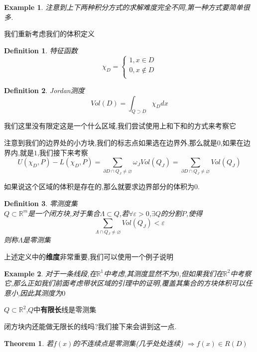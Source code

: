\documentclass[11pt,hyperref,a4paper,UTF8]{ctexart}
\newtheorem{theorem}{Theorem}[subsection]
\newtheorem{example}{Example}[subsection]
\newtheorem{definition}{Definition}[subsection]
\newcommand{\RR}{\mathbb{R}}
\begin{document}
\begin{CJK}{UTF8}{gkai}
\begin{example}
  注意到上下两种积分方式的求解难度完全不同,第一种方式要简单很多.
\end{example}

我们重新考虑我们的体积定义
\begin{definition}
  特征函数\\

  \[\chi_D = \begin{cases}
    1 , x\in D\\
    0 , x \notin D\\
  \end{cases}\]
\end{definition}

\begin{definition}
  Jordan测度\\

  \[Vol(D) = \int_{Q \supset D} \chi_D dx\]
\end{definition}

我们这里没有限定这是一个什么区域,我们尝试使用上和下和的方式来考察它

注意到我们的边界处的小方块,我们的标志点如果选在边界外,那么就是$0$,如果在边界内,就是$1$,我们接下来考察
\[U(\chi_D,P) - L(\chi_D,P) = \sum_{\partial D \cap Q_J \neq \varnothing} \omega_J Vol(Q_J) = \sum_{\partial D \cap Q_J \neq \varnothing} Vol(Q_J)\]

如果说这个区域的体积是存在的,那么就要求边界部分的体积为$0$.

\begin{definition}
  零测度集\\

  $Q \subset \RR^m$是一个闭方块,对于集合$\Lambda \subset Q$,若$\forall \varepsilon > 0$,$\exists Q$的分割$P$,使得
  \[\sum_{\Lambda \cap Q_J \neq \varnothing} Vol(Q_J) < \varepsilon\]
  则称$\Lambda$是零测集
\end{definition}

上述定义中的\textbf{维度}非常重要,我们可以使用一个例子说明

\begin{example}
  对于一条线段,在$\RR^1$中考虑,其测度显然不为$0$,但如果我们在$\RR^2$中考察它,那么正如我们前面考虑带状区域的引理中的证明,覆盖其集合的方块体积可以任意小,因此其测度为$0$
\end{example}

$Q \subset \RR^2$,$Q$中\textbf{有限长}线是零测集

闭方块内还能做无限长的线吗?我们接下来会讲到这一点.

\begin{theorem}
  若$f(x)$的不连续点是零测集(几乎处处连续) $\Rightarrow f(x) \in R(D)$
\end{theorem}


\end{CJK}
\end{document}
